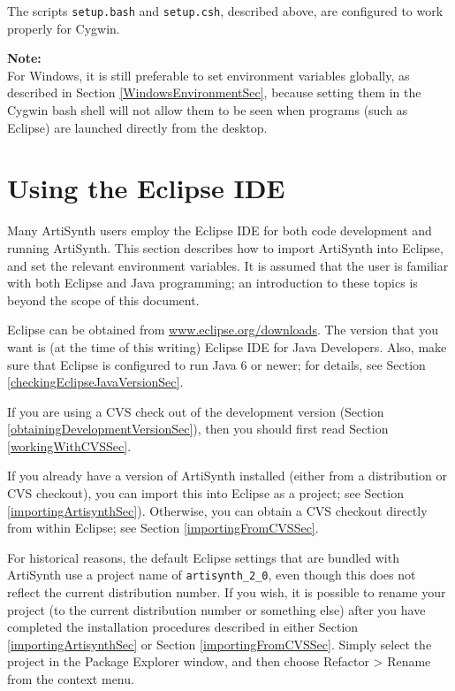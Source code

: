 \documentclass{article}
\begin{document}
The scripts {\tt setup.bash} and {\tt setup.csh}, described above, are
configured to work properly for Cygwin.

\begin{sideblock}
{\bf Note:}\\
For Windows, it is still preferable to set environment variables
globally, as described in Section \ref{WindowsEnvironmentSec}, because setting them
in the Cygwin bash shell will not allow them to be seen when programs
(such as Eclipse) are launched directly from the desktop.
\end{sideblock}

%
%

\section{Using the Eclipse IDE}
\label{EclipseSec}

Many ArtiSynth users employ the Eclipse IDE for both code development
and running ArtiSynth.  This section describes how to import ArtiSynth
into Eclipse, and set the relevant environment variables.  It is
assumed that the user is familiar with both Eclipse and Java
programming; an introduction to these topics is beyond the scope of
this document.

Eclipse can be obtained from
\href{http://www.eclipse.org/downloads}{www.eclipse.org/downloads}.
The version that you want is (at the time of this writing) {\sf
Eclipse IDE for Java Developers}. Also, make sure that Eclipse is
configured to run Java 6 or newer; for details, see Section
\ref{checkingEclipseJavaVersionSec}.

If you are using a CVS check out of the development version (Section
\ref{obtainingDevelopmentVersionSec}), then you should first read
Section \ref{workingWithCVSSec}.

If you already have a version of ArtiSynth installed (either from a
distribution or CVS checkout), you can import this into Eclipse as a
project; see Section \ref{importingArtisynthSec}). Otherwise, you can
obtain a CVS checkout directly from within Eclipse; see Section
\ref{importingFromCVSSec}.

\begin{sideblock}

For historical reasons, the default Eclipse settings that are bundled
with ArtiSynth use a project name of {\tt artisynth\_2\_0}, even though this
does not reflect the current distribution number. If you wish, it is
possible to rename your project (to the current distribution number or
something else) after you have completed the installation procedures
described in either Section \ref{importingArtisynthSec} or
Section \ref{importingFromCVSSec}. Simply select the project in the {\sf Package Explorer}
window, and then choose {\sf Refactor > Rename} from the context menu.
\end{sideblock}
\end{document}
